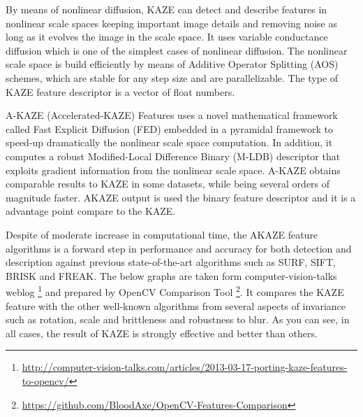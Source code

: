 By means of nonlinear diffusion, KAZE can detect and describe features in nonlinear scale spaces keeping important image details and removing noise as long as it evolves the image in the scale space. It uses variable conductance diffusion which is one of the simplest cases of nonlinear diffusion. The nonlinear scale space is build efficiently by means of Additive Operator Splitting (AOS) schemes, which are stable for any step size and are parallelizable. The type of KAZE feature descriptor is a vector of float numbers.

A-KAZE (Accelerated-KAZE) \cite{alcantarilla2011fast} Features uses a novel mathematical framework called Fast Explicit Diffusion (FED) embedded in a pyramidal framework to speed-up dramatically the nonlinear scale space computation. In addition, it computes a robust Modified-Local Difference Binary (M-LDB) descriptor that exploits gradient information from the nonlinear scale space. A-KAZE obtains comparable results to KAZE in some datasets, while being several orders of magnitude faster. AKAZE output is used the binary feature descriptor and it is a advantage point compare to the KAZE.

Despite of moderate increase in computational time, the AKAZE feature algorithms is a forward step in performance and accuracy for both detection and description against previous state-of-the-art algorithms such as SURF, SIFT, BRISK and FREAK.
The below graphs are taken form computer-vision-talks weblog \footnote{\url{http://computer-vision-talks.com/articles/2013-03-17-porting-kaze-features-to-opencv/}} and prepared by OpenCV Comparison Tool \footnote{\url{https://github.com/BloodAxe/OpenCV-Features-Comparison}}. It compares the KAZE feature with the other well-known algorithms from several aspects of invariance such as rotation, scale and brittleness and robustness to blur. As you can see, in all cases, the result of KAZE is strongly effective and better than others. 

